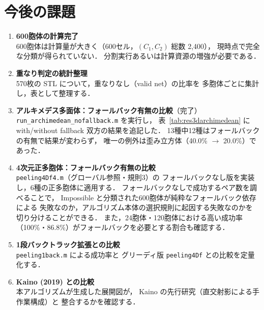 \documentclass[12pt,a4paper]{article}
\theoremstyle{definition}
\begin{document}
\section{今後の課題}
\label{sec:future}

\begin{enumerate}
  \item \textbf{600胞体の計算完了}\\
        600胞体は計算量が大きく（600セル，$(C_1,C_2)$ 総数 2,400），
        現時点で完全な分類が得られていない．
        分割実行あるいは計算資源の増強が必要である．

  \item \textbf{重なり判定の統計整理}\\
        570枚の STL について，重なりなし（valid net）の比率を
        多胞体ごとに集計し，表として整理する．

  \item \textbf{アルキメデス多面体：フォールバック有無の比較}（完了）\\
        \texttt{run\_archimedean\_nofallback.m} を実行し，
        表~\ref{tab:res3darchimedean} に with/without fallback 双方の結果を追記した．
        13種中12種はフォールバックの有無で結果が変わらず，
        唯一の例外は歪み立方体（40.0\% $\to$ 20.0\%）であった．

  \item \textbf{4次元正多胞体：フォールバック有無の比較}\\
        \texttt{peeling4Df4.m}（グローバル参照・規則3）の
        フォールバックなし版を実装し，6種の正多胞体に適用する．
        フォールバックなしで成功するペア数を調べることで，
        Impossible と分類された600胞体が純粋なフォールバック依存による
        失敗なのか，アルゴリズム本体の選択規則に起因する失敗なのかを
        切り分けることができる．
        また，24胞体・120胞体における高い成功率
        （100\%・86.8\%）がフォールバックを必要とする割合も確認する．

  \item \textbf{1段バックトラック拡張との比較}\\
        \texttt{peeling1back.m} による成功率と
        グリーディ版 \texttt{peeling4Df} との比較を定量化する．

  \item \textbf{Kaino (2019) との比較}\\
        本アルゴリズムが生成した展開図が，
        Kaino の先行研究（直交射影による手作業構成）と
        整合するかを確認する．


\end{enumerate}
\end{document}
